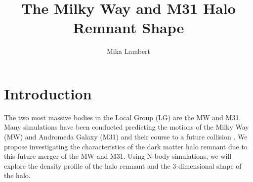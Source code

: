 \documentclass[linenumbers, twocolumn]{aastex631}
\newcommand\aastex{AAS\TeX}
\begin{document}
\title{The Milky Way and M31 Halo Remnant Shape}



\author[0000-0002-2527-8899]{Mika Lambert}






\section{Introduction} \label{sec:intro}

The two most massive bodies in the Local Group (LG) are the MW and M31.
Many simulations have been conducted predicting the motions of the Milky Way (MW) and Andromeda Galaxy (M31) and their course to a future collision \citep{2012VanDerMarel}.
We propose investigating the characteristics of the dark matter halo remnant due to this future merger of the MW and M31. 
Using N-body simulations, we will explore the density profile of the halo remnant and the 3-dimensional shape of the halo. 
\end{document}
